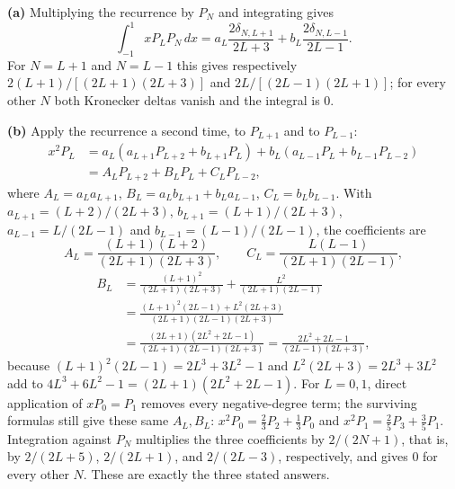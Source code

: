 \textbf{(a)} Multiplying the recurrence by $P_N$ and integrating gives
\[
\int_{-1}^1xP_LP_N\,dx
=a_L\frac{2\delta_{N,L+1}}{2L+3}
+b_L\frac{2\delta_{N,L-1}}{2L-1}.
\]
For $N=L+1$ and $N=L-1$ this gives respectively
$2(L+1)/[(2L+1)(2L+3)]$ and
$2L/[(2L-1)(2L+1)]$; for every other $N$ both Kronecker deltas
vanish and the integral is $0$.

\textbf{(b)} Apply the recurrence a second time, to $P_{L+1}$ and
to $P_{L-1}$:
\[
\begin{aligned}
x^2P_L
&=a_L(a_{L+1}P_{L+2}+b_{L+1}P_L)
+b_L(a_{L-1}P_L+b_{L-1}P_{L-2})\\
&=A_LP_{L+2}+B_LP_L+C_LP_{L-2},
\end{aligned}
\]
where $A_L=a_La_{L+1}$, $B_L=a_Lb_{L+1}+b_La_{L-1}$,
$C_L=b_Lb_{L-1}$. With $a_{L+1}=(L+2)/(2L+3)$,
$b_{L+1}=(L+1)/(2L+3)$, $a_{L-1}=L/(2L-1)$ and
$b_{L-1}=(L-1)/(2L-1)$, the coefficients are
\[
A_L=\frac{(L+1)(L+2)}{(2L+1)(2L+3)},\qquad
C_L=\frac{L(L-1)}{(2L+1)(2L-1)},
\]
\[
\begin{aligned}
B_L&=\frac{(L+1)^2}{(2L+1)(2L+3)}
+\frac{L^2}{(2L+1)(2L-1)}\\
&=\frac{(L+1)^2(2L-1)+L^2(2L+3)}
{(2L+1)(2L-1)(2L+3)}\\
&=\frac{(2L+1)(2L^2+2L-1)}
{(2L+1)(2L-1)(2L+3)}
=\frac{2L^2+2L-1}{(2L-1)(2L+3)},
\end{aligned}
\]
because $(L+1)^2(2L-1)=2L^3+3L^2-1$ and $L^2(2L+3)=2L^3+3L^2$ add
to $4L^3+6L^2-1=(2L+1)(2L^2+2L-1)$.
For $L=0,1$, direct application of $xP_0=P_1$ removes every
negative-degree term; the surviving formulas still give these
same $A_L,B_L$: $x^2P_0=\frac23P_2+\frac13P_0$ and
$x^2P_1=\frac25P_3+\frac35P_1$. Integration against $P_N$ multiplies
the three coefficients by $2/(2N+1)$, that is, by $2/(2L+5)$,
$2/(2L+1)$, and $2/(2L-3)$, respectively, and gives $0$ for every
other $N$. These are exactly the three stated answers.

